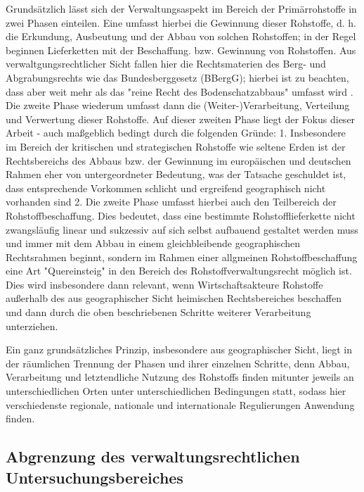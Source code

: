 \documentclass[12pt,a4paper,oneside]{book} %
\begin{document}
Grundsätzlich lässt sich der Verwaltungsaspekt im Bereich der Primärrohstoffe in zwei Phasen einteilen. Eine umfasst hierbei die Gewinnung dieser Rohstoffe, d. h. die Erkundung, Ausbeutung und der Abbau von solchen Rohstoffen; in der Regel beginnen Lieferketten mit der Beschaffung. bzw. Gewinnung von Rohstoffen. Aus verwaltgungsrechtlicher Sicht fallen hier die Rechtsmaterien des Berg- und Abgrabungsrechts wie das Bundesberggesetz (BBergG); hierbei ist zu beachten, dass aber weit mehr als das "reine Recht des Bodenschatzabbaus" umfasst wird \autocite[245]{frau 2023}. Die zweite Phase wiederum umfasst dann die (Weiter-)Verarbeitung, Verteilung und Verwertung dieser Rohstoffe. Auf dieser zweiten Phase liegt der Fokus dieser Arbeit - auch maßgeblich bedingt durch die folgenden Gründe:
1. Insbesondere im Bereich der kritischen und strategischen Rohstoffe wie seltene Erden ist der Rechtsbereichs des Abbaus bzw. der Gewinnung im europäischen und deutschen Rahmen eher von untergeordneter Bedeutung, was der Tatsache geschuldet ist, dass entsprechende Vorkommen schlicht und ergreifend geographisch nicht vorhanden sind
2. Die zweite Phase umfasst hierbei auch den Teilbereich der Rohstoffbeschaffung. Dies bedeutet, dass eine bestimmte Rohstofflieferkette nicht zwangsläufig linear und sukzessiv auf sich selbst aufbauend gestaltet werden muss und immer mit dem Abbau in einem gleichbleibende geographischen Rechtsrahmen beginnt, sondern im Rahmen einer allgmeinen Rohstoffbeschaffung eine Art "Quereinsteig" in den Bereich des Rohstoffverwaltungsrecht möglich ist. Dies wird insbesondere dann relevant, wenn Wirtschaftsakteure Rohstoffe außerhalb des aus geographischer Sicht heimischen Rechtsbereiches beschaffen und dann durch die oben beschriebenen Schritte weiterer Verarbeitung unterziehen.

Ein ganz grundsätzliches Prinzip, insbesondere aus geographischer Sicht, liegt in der räumlichen Trennung der Phasen und ihrer einzelnen Schritte, denn Abbau, Verarbeitung und letztendliche Nutzung des Rohstoffs finden mitunter jeweils an unterschiedlichen Orten unter unterschiedlichen Bedingungen statt, sodass hier verschiedenste regionale, nationale und internationale Regulierungen Anwendung finden.

\subsection{Abgrenzung des verwaltungsrechtlichen Untersuchungsbereiches}
\end{document}

